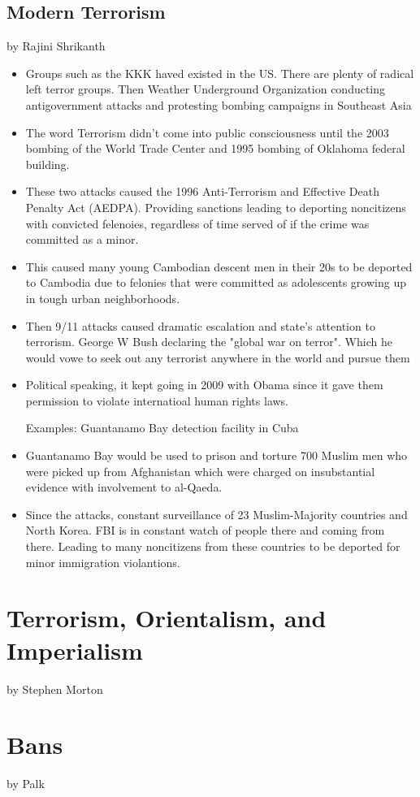 \documentclass{article}
\begin{document}
\subsection{Modern Terrorism}
by Rajini Shrikanth
\begin{itemize}
  \item Groups such as the KKK haved existed in the US.
    There are plenty of radical left terror groups.
    Then Weather Underground Organization conducting antigovernment attacks
    and protesting bombing campaigns in Southeast Asia
  \item The word Terrorism didn't come into public consciousness until the 2003 bombing
    of the World Trade Center and 1995 bombing of Oklahoma federal building.
  \item These two attacks caused the 1996 Anti-Terrorism and Effective
    Death Penalty Act (AEDPA).
    Providing sanctions leading to deporting noncitizens with convicted felenoies,
    regardless of time served of if the crime was committed as a minor.
  \item This caused many young Cambodian descent men in their 20s to be deported
    to Cambodia due to felonies that were committed as adolescents growing up
    in tough urban neighborhoods.
  \item Then 9/11 attacks caused dramatic escalation and state's attention to terrorism.
    George W Bush declaring the "global war on terror".
    Which he would vowe to seek out any terrorist anywhere in the world and pursue them
  \item Political speaking, it kept going in 2009 with Obama since it gave them
    permission to violate internatioal human rights laws.

    Examples:
    Guantanamo Bay detection facility in Cuba
  \item Guantanamo Bay would be used to prison and torture 700 Muslim men who were
    picked up from Afghanistan which were charged on insubstantial evidence with
    involvement to al-Qaeda.
  \item Since the attacks, constant surveillance of 23 Muslim-Majority countries and
    North Korea. FBI is in constant watch of people there and coming from there.
    Leading to many noncitizens from these countries to be deported
    for minor immigration violantions.

\end{itemize}


\section{Terrorism, Orientalism, and Imperialism}
by Stephen Morton

\section{Bans}
by Palk
\end{document}
